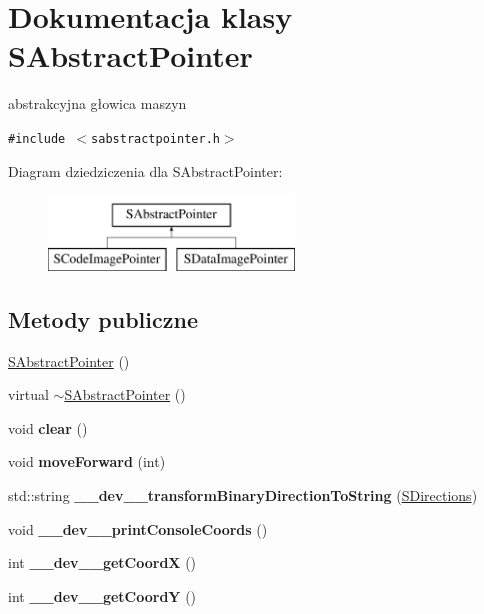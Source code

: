 \hypertarget{classSAbstractPointer}{
\section{Dokumentacja klasy SAbstractPointer}
\label{classSAbstractPointer}
}
abstrakcyjna głowica maszyn  


{\tt \#include $<$sabstractpointer.h$>$}

Diagram dziedziczenia dla SAbstractPointer:\begin{figure}[H]
\begin{center}
\leavevmode
\includegraphics[height=2cm]{classSAbstractPointer}
\end{center}
\end{figure}
\subsection*{Metody publiczne}
\begin{CompactItemize}
\item 
\hyperlink{classSAbstractPointer_9281c3dba0da68460fa87bd17bd768b4}{SAbstractPointer} ()
\item 
virtual \hyperlink{classSAbstractPointer_9973354ecf610b3d48170dd70f0b22ce}{$\sim$SAbstractPointer} ()
\item 
\hypertarget{classSAbstractPointer_bb15625597bfe9f3927cdc360214bc55}{
void \textbf{clear} ()}
\label{classSAbstractPointer_bb15625597bfe9f3927cdc360214bc55}

\item 
\hypertarget{classSAbstractPointer_c4655988c5ae9f94a00e3ccd0ed14863}{
void \textbf{moveForward} (int)}
\label{classSAbstractPointer_c4655988c5ae9f94a00e3ccd0ed14863}

\item 
\hypertarget{classSAbstractPointer_5d7349c25205be738561fa791a77a3b8}{
std::string \textbf{\_\-\_\-dev\_\-\_\-transformBinaryDirectionToString} (\hyperlink{senums_8h_039d4115103dc22e0555ecc968fecbf0}{SDirections})}
\label{classSAbstractPointer_5d7349c25205be738561fa791a77a3b8}

\item 
\hypertarget{classSAbstractPointer_3faa92c6a0de5ea971a7d32ceb51980f}{
void \textbf{\_\-\_\-dev\_\-\_\-printConsoleCoords} ()}
\label{classSAbstractPointer_3faa92c6a0de5ea971a7d32ceb51980f}

\item 
\hypertarget{classSAbstractPointer_2a94015a951c9a7181d8aad4d4a356d3}{
int \textbf{\_\-\_\-dev\_\-\_\-getCoordX} ()}
\label{classSAbstractPointer_2a94015a951c9a7181d8aad4d4a356d3}

\item 
\hypertarget{classSAbstractPointer_413be96bf36c59e49c00b5ae0c297c90}{
int \textbf{\_\-\_\-dev\_\-\_\-getCoordY} ()}
\label{classSAbstractPointer_413be96bf36c59e49c00b5ae0c297c90}

\end{CompactItemize}
